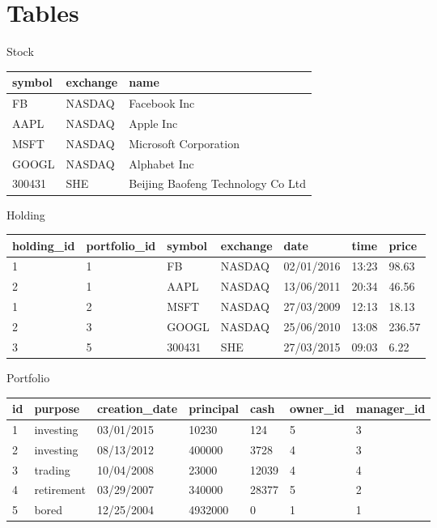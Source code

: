 \documentclass[letterpaper]{report}
\begin{document}
\section*{Tables}
\textsf{Stock}
\begin{table}[h]
	\begin{tabular}{lll}
		\textbf{symbol} & \textbf{exchange} & \textbf{name} \\ \hline
		FB & NASDAQ & Facebook Inc \\
		AAPL & NASDAQ & Apple Inc \\
		MSFT & NASDAQ & Microsoft Corporation \\
		GOOGL & NASDAQ & Alphabet Inc \\
		300431 & SHE & Beijing Baofeng Technology Co Ltd \\
	\end{tabular}
\end{table}

\textsf{Holding}
\begin{table}[h]
	\begin{tabular}{lllllll}
		\textbf{holding\_id} & \textbf{portfolio\_id} & \textbf{symbol} & \textbf{exchange} & \textbf{date} & \textbf{time} & \textbf{price} \\ \hline
		1 & 1 & FB & NASDAQ & 02/01/2016 & 13:23 & 98.63 \\
		2 & 1 & AAPL & NASDAQ & 13/06/2011 & 20:34 & 46.56 \\
		1 & 2 & MSFT & NASDAQ & 27/03/2009 & 12:13 & 18.13 \\
		2 & 3 & GOOGL & NASDAQ & 25/06/2010 & 13:08 & 236.57 \\
		3 & 5 & 300431 & SHE & 27/03/2015 & 09:03 & 6.22 \\
	\end{tabular}
\end{table}

\textsf{Portfolio}
\begin{table}[h]
	\begin{tabular}{lllllll}
		\textbf{id} & \textbf{purpose} & \textbf{creation\_date} & \textbf{principal} & \textbf{cash} & \textbf{owner\_id} & \textbf{manager\_id} \\ \hline
		1 & investing & 03/01/2015 & 10230 & 124 & 5 & 3 \\
		2 & investing & 08/13/2012 & 400000 & 3728 & 4 & 3 \\
		3 & trading & 10/04/2008 & 23000 & 12039 & 4 & 4 \\
		4 & retirement & 03/29/2007 & 340000 & 28377 & 5 & 2 \\
		5 & bored & 12/25/2004 & 4932000 & 0 & 1 & 1 \\
	\end{tabular}
\end{table}
\end{document}
